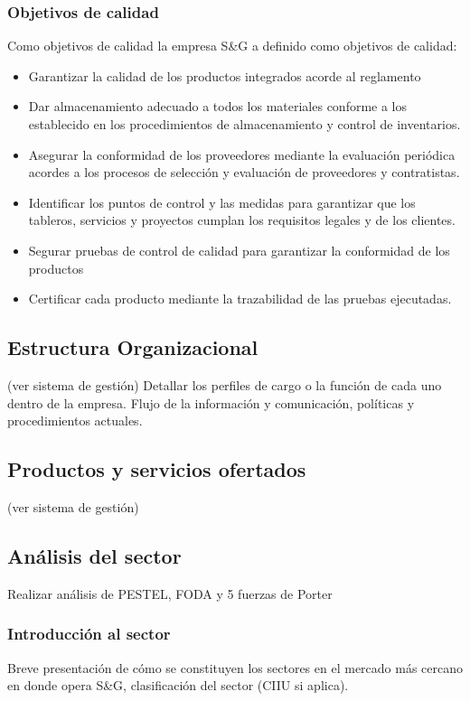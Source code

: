 \subsubsection{Objetivos de calidad} 
Como objetivos de calidad la empresa S\&G a definido como objetivos de calidad:
\begin{itemize}
    \item Garantizar la calidad de los productos integrados acorde al reglamento
    \item Dar almacenamiento adecuado a todos los materiales conforme a los establecido en los procedimientos de almacenamiento y control de inventarios.
    \item Asegurar la conformidad de los proveedores mediante la evaluación periódica acordes a los procesos de selección y evaluación de proveedores y contratistas.
    \item Identificar los puntos de control y las medidas para garantizar que los tableros, servicios y proyectos cumplan los requisitos legales y de los clientes.
    \item Segurar pruebas de control de calidad para garantizar la conformidad de los productos
    \item Certificar cada producto mediante la trazabilidad de las pruebas ejecutadas.
\end{itemize}


\subsection{Estructura Organizacional}


(ver sistema de gestión)
Detallar los perfiles de cargo o la función de cada uno dentro de la empresa.
Flujo de la información y comunicación, políticas y procedimientos actuales.


\subsection{Productos y servicios ofertados} 
(ver sistema de gestión)

\subsection{Análisis del sector} 
Realizar análisis de PESTEL, FODA y 5 fuerzas de Porter

\subsubsection{Introducción al sector}
Breve presentación de cómo se constituyen los sectores en el mercado más cercano en donde opera S\&G, clasificación del sector (CIIU si aplica).


